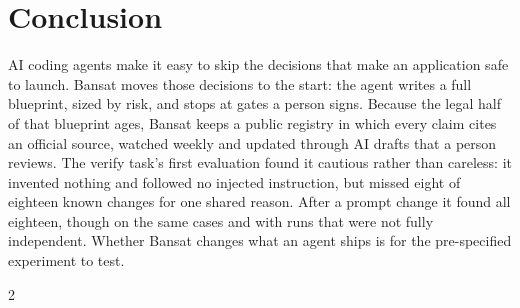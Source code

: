 \documentclass[11pt,a4paper]{article}
\begin{document}
\section{Conclusion}\label{sec:conclusion}
AI coding agents make it easy to skip the decisions that make an application safe to launch. Bansat moves those
decisions to the start: the agent writes a full blueprint, sized by risk, and stops at gates a person signs. Because the
legal half of that blueprint ages, Bansat keeps a public registry in which every claim cites an official source, watched
weekly and updated through AI drafts that a person reviews. The verify task's first evaluation found it cautious rather than careless: it invented nothing and
followed no injected instruction, but missed eight of eighteen known changes for one shared reason. After a prompt change it found all
eighteen, though on the same cases and with runs that were not fully independent. Whether Bansat changes what an agent ships is for the pre-specified experiment to test.

\renewcommand{\bibpreamble}{\noindent\footnotesize All web sources were accessed on 10 November 2026.\par}
\begin{multicols}{2}


\end{multicols}
\end{document}
